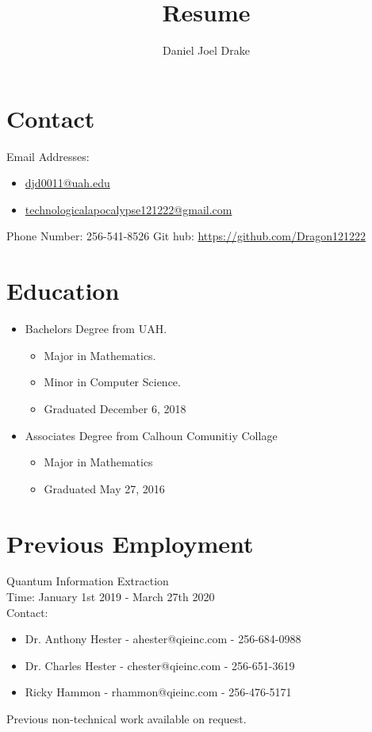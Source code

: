 \documentclass[10pt]{extarticle}
\title{Resume}
\author{Daniel Joel Drake}
\theoremstyle{plain}
\theoremstyle{Definition}
\theoremstyle{Definition}
\theoremstyle{plain}
\begin{document}
	\twocolumn
	\maketitle
	\section{Contact} 
		Email Addresses: 
		\begin{itemize}
			\item \href{mailto:djd0011@uah.edu}{djd0011@uah.edu}
			\item \href{mailto:technologicalapocalypse121222@gmail.com}{technologicalapocalypse121222@gmail.com}
		\end{itemize}	
		Phone Number: 256-541-8526
		Git hub: \href{https://github.com/Dragon121222}{https://github.com/Dragon121222}
	\section{Education}
		\begin{itemize}
			\item Bachelors Degree from UAH.
			\begin{itemize}
				\item Major in Mathematics.
				\item Minor in Computer Science.
				\item Graduated December 6, 2018
		\end{itemize}
			\item Associates Degree from Calhoun Comunitiy Collage
			\begin{itemize}
				\item Major in Mathematics
				\item Graduated May 27, 2016
			\end{itemize}
		\end{itemize}
	\section{Previous Employment}
		Quantum Information Extraction \\
		Time: January 1st 2019 - March 27th 2020 \\ 
		Contact: 
		\begin{itemize}
			\item Dr. Anthony Hester - ahester@qieinc.com - 256-684-0988
			\item Dr. Charles Hester - chester@qieinc.com - 256-651-3619
			\item Ricky Hammon - rhammon@qieinc.com - 256-476-5171
		\end{itemize}	
	Previous non-technical work available on request. 
\end{document}
